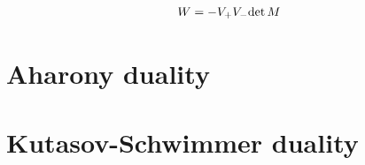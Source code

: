 \begin{equation}
W = -  V_+ V_-  \mathrm{det } \,{M}
\end{equation}



\section{Aharony duality}




\section{Kutasov-Schwimmer duality}
